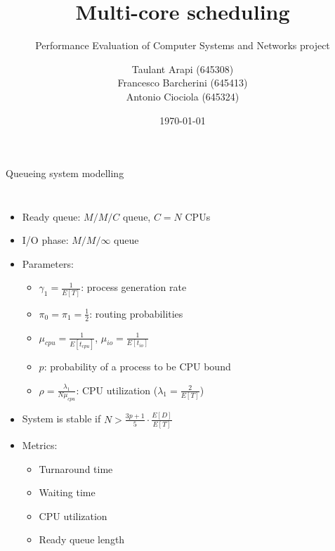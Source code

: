 \documentclass[aspectratio=169,xcolor=dvipsnames]{beamer}
\title{Multi-core scheduling}
\subtitle{Performance Evaluation of Computer Systems and Networks project}
\author{Taulant Arapi (645308)\\Francesco Barcherini (645413)\\Antonio Ciociola (645324)}
\date{\today} %
\begin{document}
\begin{frame}
    \titlepage
\end{frame}


\begin{frame}{Queueing system modelling}
    \begin{columns}[c]
        \begin{itemize}
            \item Ready queue: $M/M/C$ queue, $C = N$ CPUs
            \item I/O phase: $M/M/\infty$ queue
            \item Parameters:
            \begin{itemize}
                \item $\gamma_1 = \frac{1}{E[T]}$: process generation rate
                \item $\pi_0 = \pi_1 = \frac{1}{2}$: routing probabilities
                \item $\mu_{cpu} = \frac{1}{E[t_{cpu}]}$, $\mu_{io} = \frac{1}{E[t_{io}]}$
                \item $p$: probability of a process to be CPU bound
                \item $\rho = \frac{\lambda_1}{N\mu_{cpu}}$: CPU utilization ($\lambda_1 = \frac{2}{E[T]}$)
            \end{itemize}
            \item System is stable if $N > \frac{3p+1}{5}\cdot \frac{E[D]}{E[T]}$
            \item Metrics:
            \begin{itemize}
                \item Turnaround time
                \item Waiting time
                \item CPU utilization
                \item Ready queue length
            \end{itemize}
        \end{itemize}

\end{columns}
\end{frame}
\end{document}
